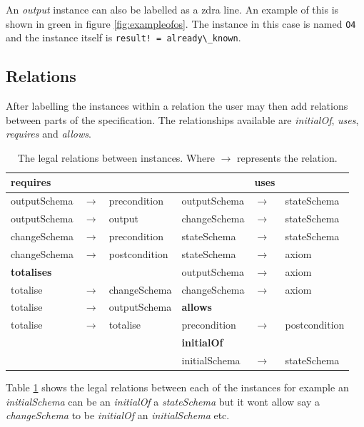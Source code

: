An \emph{output} instance can also be labelled as a \gls{zdra} line. An example of this is shown in green in figure \ref{fig:exampleofos}. The instance in this case is named \verb|O4| and the instance itself is \verb|result! = already\_known|.

\subsection{Relations}
\label{subsec:zdrarelations}

After labelling the instances within a relation the user may then add relations between parts of the specification. The relationships available are \emph{initialOf}, \emph{uses}, \emph{requires} and \emph{allows}.

\begin{table}[H]
\begin{tabular}{|lll||lll|}
\hline
\textbf{requires} & & &  & \textbf{uses} & \\
\hline
outputSchema & $\longrightarrow$ & precondition  & outputSchema & $\longrightarrow$ & stateSchema\\
outputSchema & $\longrightarrow$ & output & changeSchema & $\longrightarrow$ & stateSchema \\
changeSchema & $\longrightarrow$ & precondition  & stateSchema & $\longrightarrow$ & stateSchema \\
changeSchema & $\longrightarrow$ & postcondition  & stateSchema & $\longrightarrow$ & axiom \\
\cline{1-3}
\textbf{totalises} & &  & outputSchema & $\longrightarrow$ & axiom \\
\cline{1-3}
totalise & $\longrightarrow$ & changeSchema  & changeSchema & $\longrightarrow$ & axiom \\
\cline{4-6}
totalise & $\longrightarrow$ & outputSchema & \textbf{allows}  & & \\
\cline{4-6}
totalise & $\longrightarrow$ & totalise  & precondition  & $\longrightarrow$  & postcondition \\
\cline{4-6}
& &  & \textbf{initialOf} &  &  \\ 
\cline{4-6}
& &  & initialSchema & $\longrightarrow$ & stateSchema \\ 
\hline
\end{tabular}
\caption{\label{tab:relationsallowed} The legal relations between instances. Where $\longrightarrow$ represents the relation.}
\end{table}

Table \ref{tab:relationsallowed} shows the legal relations between each of the instances for example an \emph{initialSchema} can be an \emph{initialOf} a \emph{stateSchema} but it wont allow say a \emph{changeSchema} to be \emph{initialOf} an \emph{initialSchema} etc.

